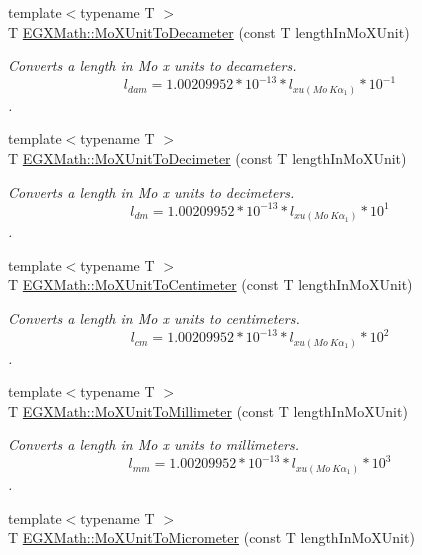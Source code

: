 \begin{DoxyCompactItemize}
{\footnotesize template$<$typename T $>$ }\\T \mbox{\hyperlink{group___e_g_x_math-_conversions-_length_conversions-_non-_s_i-_mo_x_unit-_s_i_ga8062fcff8f184d57df1ba88c72902f0d}{E\+G\+X\+Math\+::\+Mo\+X\+Unit\+To\+Decameter}} (const T length\+In\+Mo\+X\+Unit)
\begin{DoxyCompactList}\small\item\em Converts a length in Mo x units to decameters. \[ l_{dam}=1.00209952*10^{-13} * l_{xu(Mo\ K\alpha_1)} * 10^{-1} \]. \end{DoxyCompactList}\item 
{\footnotesize template$<$typename T $>$ }\\T \mbox{\hyperlink{group___e_g_x_math-_conversions-_length_conversions-_non-_s_i-_mo_x_unit-_s_i_ga986fd20a8a60d8eff54b0eca362518e4}{E\+G\+X\+Math\+::\+Mo\+X\+Unit\+To\+Decimeter}} (const T length\+In\+Mo\+X\+Unit)
\begin{DoxyCompactList}\small\item\em Converts a length in Mo x units to decimeters. \[ l_{dm}=1.00209952*10^{-13} * l_{xu(Mo\ K\alpha_1)} * 10^{1} \]. \end{DoxyCompactList}\item 
{\footnotesize template$<$typename T $>$ }\\T \mbox{\hyperlink{group___e_g_x_math-_conversions-_length_conversions-_non-_s_i-_mo_x_unit-_s_i_ga50ad909022e97526fb43b5887e58f1d7}{E\+G\+X\+Math\+::\+Mo\+X\+Unit\+To\+Centimeter}} (const T length\+In\+Mo\+X\+Unit)
\begin{DoxyCompactList}\small\item\em Converts a length in Mo x units to centimeters. \[ l_{cm}=1.00209952*10^{-13} * l_{xu(Mo\ K\alpha_1)} * 10^{2} \]. \end{DoxyCompactList}\item 
{\footnotesize template$<$typename T $>$ }\\T \mbox{\hyperlink{group___e_g_x_math-_conversions-_length_conversions-_non-_s_i-_mo_x_unit-_s_i_gacc95302aafadf7f38b9952f6a73c1279}{E\+G\+X\+Math\+::\+Mo\+X\+Unit\+To\+Millimeter}} (const T length\+In\+Mo\+X\+Unit)
\begin{DoxyCompactList}\small\item\em Converts a length in Mo x units to millimeters. \[ l_{mm}=1.00209952*10^{-13} * l_{xu(Mo\ K\alpha_1)} * 10^{3} \]. \end{DoxyCompactList}\item 
{\footnotesize template$<$typename T $>$ }\\T \mbox{\hyperlink{group___e_g_x_math-_conversions-_length_conversions-_non-_s_i-_mo_x_unit-_s_i_ga1608daf69fda5b90eabc5f8d47831f18}{E\+G\+X\+Math\+::\+Mo\+X\+Unit\+To\+Micrometer}} (const T length\+In\+Mo\+X\+Unit)

\end{DoxyCompactItemize}
